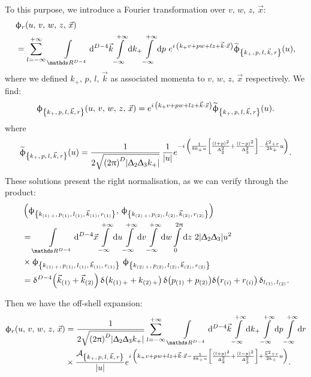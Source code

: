To this purpose, we introduce a Fourier transformation over $v,\, w,\, z,\, \vec{x}$:
\begin{equation}
  \begin{split}
    & \phi_r\qty( u,\, v,\, w,\, z,\, \vec{x})
    \\
    & =
    \infinfsum{l}\,
    \int\limits_{\R^{D-4}} \dd[D-4]{\vec{k}}
    \infinfint{k_+}
    \infinfint{p}\,
    e^{i\, \qty( k_+ v + p w + l z + \vec{k} \cdot \vec{x} )}
    \tphi_{\kmkrgen}(u),
  \end{split}
\end{equation}
where we defined $k_+,\, p,\, l,\, \vec{k}$ as associated momenta to $v,\, w,\, z,\, \vec{x}$ respectively.
We find:
\begin{equation}
  \upphi_{\qty{k_+,\, p,\, l,\, \vec{k},\, r}}\qty( u,\, v,\, w,\, z,\, \vec{x} )
  =
  e^{i\, \qty( k_+ v + p w + l z + \vec{k} \cdot \vec{x} )}
  \widetilde{\upphi}_{\qty{k_+,\, p,\, l,\, \vec{k},\, r}}( u ).
\end{equation}
where
\begin{equation}
  \tphi_{\kmkrgen}( u )
  =
  \frac{1}{2 \sqrt{\qty(2 \pi)^D \abs{\Delta_2 \Delta_3 k_+}}}\,
  \frac{1}{\abs{u}}
  e^{%
    -i\, \qty(%
      \frac{1}{8 k_+ u}
      \qty[ \frac{(l + p)^2}{\Delta_2^2} + \frac{(l - p)^2}{\Delta_3^2} ]
      -
      \frac{\vec{k}^2 + r}{2 k_+} u
    )
  }.
  \label{eq:GNBO_reg_wave_functions}
\end{equation}
These solutions present the right normalisation, as we can verify through the product:
\begin{equation}
  \begin{split}
    & \left( \phi_{\kmkrgenN{1}},\, \phi_{\kmkrgenN{2}} \right)
    \\
    & =
    \int\limits_{\R^{D-4}} \dd[D-4]{\vec{x}}
    \infinfint{u}
    \infinfint{v}
    \infinfint{w}
    \finiteint{z}{0}{2\pi}\,
    2 \abs{\Delta_2 \Delta_3} u^2
    \\
    & \times
    \phi_{\kmkrgenN{1}}~
    \phi_{\kmkrgenN{2}}
    \\
    & =
    \delta^{D - 4}\qty( \vec{k}_{\qty(1)} + \vec{k}_{\qty(2)} )\,
    \delta\qty( k_{\qty(1)\, +} + k_{\qty(2)\, +} )\,
    \delta\qty( p_{\qty(1)} + p_{\qty(2)} )
    \delta\qty( r_{\qty(i)} + r_{\qty(i)} )\,
    \delta_{l_{\qty(1)},\, l_{\qty(2)}}.
  \end{split}
\end{equation}

Then we have the off-shell expansion:
\begin{equation}
  \begin{split}
    \phi_r\qty( u,\, v,\, w,\, z,\, \vec{x} )
    & =
    \frac{1}{2 \sqrt{\qty( 2 \pi )^D \abs{\Delta_2 \Delta_3 k_+}}}
    \infinfsum{l}\,
    \int\limits_{\R^{D-4}} \dd[D-4]{\vec{k}}
    \infinfint{k_+}
    \infinfint{p}
    \infinfint{r}
    \\
    & \times
    \frac{\cA_{\kmkrgen}}{\abs{u}}
    e^{%
      i\, \qty(%
        k_+ v + p w + l z + \vec{k} \cdot \vec{x}
        -
        \frac{1}{8 k_+ u}
        \qty[ \frac{(l + p)^2}{\Delta_2^2} + \frac{(l - p)^2}{\Delta_3^2} ]
        +
        \frac{\vec{k}^2 + r}{2 k_+} u
      )
    }.
  \end{split}
\end{equation}


